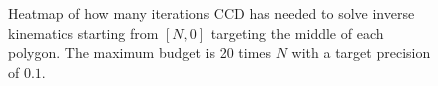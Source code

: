 \begin{figure}
    \begin{center}
        \hfill
        \hfill
    \end{center}
    \caption[CCD iteration heatmap]{Heatmap of how many iterations CCD has needed to solve inverse kinematics starting from $[N, 0]$ targeting the middle of each polygon. The maximum budget is 20 times $N$ with a target precision of $0.1$.}
    \label{fig:CCD_iteration}
\end{figure}
